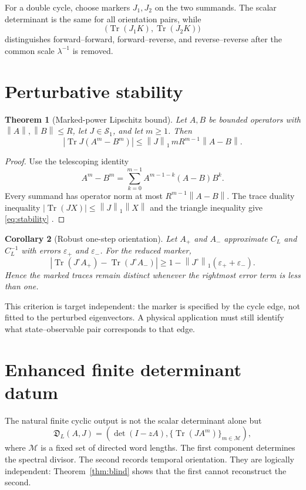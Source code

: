 \documentclass[12pt]{article}
\newtheorem{theorem}{Theorem}[section]
\newtheorem{corollary}[theorem]{Corollary}
\theoremstyle{remark}
\newcommand{\Tr}{\operatorname{Tr}}
\newcommand{\norm}[1]{\left\lVert#1\right\rVert}
\begin{document}
For a double cycle, choose markers $J_1,J_2$ on the two summands.  The scalar
determinant is the same for all orientation pairs, while
\[
 \bigl(\Tr(J_1K),\Tr(J_2K)\bigr)
\]
distinguishes forward--forward, forward--reverse, and reverse--reverse after
the common scale $\lambda^{-1}$ is removed.

\section{Perturbative stability}

\begin{theorem}[Marked-power Lipschitz bound]\label{thm:stability}
Let $A,B$ be bounded operators with $\norm A,\norm B\le R$, let
$J\in\mathcal S_1$, and let $m\ge1$.  Then
\begin{equation}\label{eq:stability}
 |\Tr J(A^m-B^m)|
 \le \norm J_1\,mR^{m-1}\norm{A-B}.
\end{equation}
\end{theorem}

\begin{proof}
Use the telescoping identity
\[
 A^m-B^m=\sum_{k=0}^{m-1}A^{m-1-k}(A-B)B^k.
\]
Every summand has operator norm at most
$R^{m-1}\norm{A-B}$.  The trace duality inequality
$|\Tr(JX)|\le\norm J_1\norm X$ and the triangle inequality give
\eqref{eq:stability} \citep{Simon2005}.
\end{proof}

\begin{corollary}[Robust one-step orientation]
Let $A_+$ and $A_-$ approximate $C_L$ and $C_L^{-1}$ with errors
$\varepsilon_+$ and $\varepsilon_-$.  For the reduced marker,
\[
 |\Tr(J^\circ A_+)-\Tr(J^\circ A_-)|
 \ge1-\norm{J^\circ}_1(\varepsilon_++\varepsilon_-).
\]
Hence the marked traces remain distinct whenever the rightmost error term is
less than one.
\end{corollary}

This criterion is target independent: the marker is specified by the cycle
edge, not fitted to the perturbed eigenvectors.  A physical application must
still identify what state--observable pair corresponds to that edge.

\section{Enhanced finite determinant datum}

The natural finite cyclic output is not the scalar determinant alone but
\begin{equation}\label{eq:enhanced}
 \mathfrak D_L(A,J)=
 \left(
 \det(I-zA),
 \{\Tr(JA^m)\}_{m\in\mathcal M}
 \right),
\end{equation}
where $\mathcal M$ is a fixed set of directed word lengths.  The first
component determines the spectral divisor.  The second records temporal
orientation.  They are logically independent: Theorem~\ref{thm:blind}
shows that the first cannot reconstruct the second.
\end{document}

